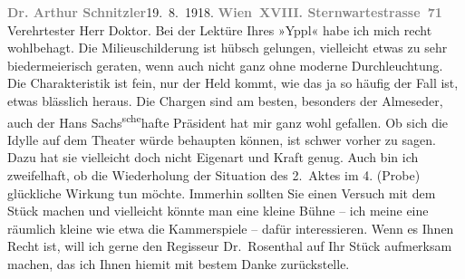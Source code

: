 \begin{ledgroupsized}[t]{13cm}
           {\pb}\textcolor{gray}{\textbf{Dr. Arthur Schnitzler}}\hfill 19. 8. 1918.\pend
           \pstart
           \textcolor{gray}{\textbf{Wien XVIII. Sternwartestrasse 71}}\pend
           \pstart\center{}Verehrtester Herr Doktor.\pend\pstart
           Bei der Lektüre Ihres »Yppl« habe ich mich recht
               wohlbehagt. Die Milieuschilderung ist hübsch gelungen, vielleicht etwas zu sehr
               biedermeierisch geraten, wenn auch nicht ganz ohne moderne Durchleuchtung. Die
               Charakteristik ist fein, nur der Held kommt, wie das ja so häufig der Fall ist, etwas
               blässlich heraus. Die Chargen sind am besten, besonders der Almeseder, auch der Hans Sachs\substVorne{}\textsuperscript{sche}\substDazwischen{}hafte\substHinten{} Präsident hat mir ganz wohl gefallen.\pend
           \pstart
           Ob sich die Idylle auf dem Theater würde behaupten können, ist schwer vorher zu
               sagen. Dazu hat sie vielleicht doch nicht Eigenart und Kraft genug. Auch bin ich
               zweifelhaft, ob die Wiederholung der Situation des 2. Aktes im 4. (Probe) glückliche
               Wirkung tun möchte. Immerhin sollten Sie einen Versuch mit dem {\pb}Stück machen und vielleicht
               könnte man eine kleine Bühne – ich meine eine räumlich kleine wie etwa die Kammerspiele – dafür interessieren. Wenn es Ihnen
               Recht ist, will ich gerne den Regisseur Dr. Rosenthal auf Ihr Stück aufmerksam machen, das ich Ihnen hiemit mit bestem Danke zurückstelle.

\end{ledgroupsized}
